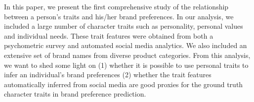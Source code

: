 In this paper, we present the first comprehensive study of the relationship between a person's traits and his/her brand preferences. In our analysis, we included a large number of character traits such as personality, personal values and individual needs. These trait features were obtained from both a psychometric survey and automated social media analytics. We also included an extensive set of brand names from diverse product categories. From this analysis, we want to shed some light on (1) whether it is possible to use personal traits to infer an individual's brand preferences (2) whether the trait features automatically inferred from social media are good proxies for the ground truth character traits in brand preference prediction.
